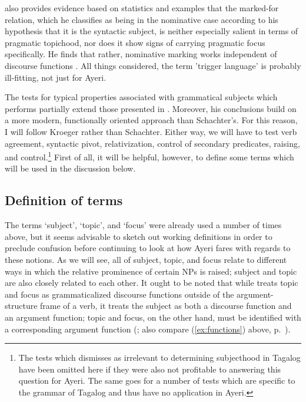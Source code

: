 \citet{kroeger1991} also provides evidence based on statistics and examples
that the marked-for relation, which he classifies as being in the nominative
case according to his hypothesis that it is the syntactic subject, is neither
especially salient in terms of pragmatic topichood, nor does it show signs of
carrying pragmatic focus specifically. He finds that rather, nominative marking
works independent of discourse functions \citep[56\psqq]{kroeger1991}.  All
things considered, the term 'trigger language' is probably ill-fitting, not
just for Ayeri.

The tests for typical properties associated with grammatical subjects which
\citet{kroeger1991} performs partially extend those presented in
\citet{schachter1976}. Moreover, his conclusions build on a more modern,
functionally oriented approach than Schachter's. For this reason, I will follow
Kroeger rather than Schachter. Either way, we will have to test verb agreement,
syntactic pivot, relativization, control of secondary predicates, raising, and
control.\footnote{The tests which \citet{kroeger1991} dismisses as irrelevant
to determining subjecthood in Tagalog have been omitted here if they were also
not profitable to answering this question for Ayeri. The same goes for a number
of tests which are specific to the grammar of Tagalog and thus have no
application in Ayeri.} First of all, it will be helpful, however, to define
some terms which will be used in the discussion below.

\subsection{Definition of terms}

The terms `subject', `topic', and `focus' were already used a number of times
above, but it seems advisable to sketch out working definitions in order to
preclude confusion before continuing to look at how Ayeri fares with regards to
these notions. As we will see, all of subject, topic, and focus relate to
different ways in which the relative prominence of certain NPs is raised;
subject and topic are also closely related to each other. It ought to be noted
that while \Lfg{} treats topic and focus as grammaticalized discourse functions
outside of the argument-structure frame of a verb, it treats the subject as
both a discourse function and an argument function; topic and focus, on the
other hand, must be identified with a corresponding argument function
(\cite[99--100]{bresnan2016}; also compare (\ref{ex:functions}) above,
p.~\pageref{ex:functions}).

